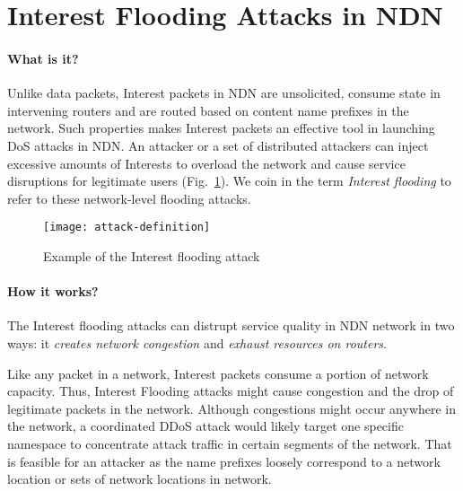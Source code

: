 \section{Interest Flooding Attacks in NDN}
\label{sec:interest flooding}



\paragraph{What is it?}

Unlike data packets, Interest packets in NDN are unsolicited, consume state in intervening routers and are routed based on content name prefixes in the network. Such properties makes Interest packets an effective tool in launching DoS attacks in NDN. An attacker or a set of distributed attackers can inject excessive amounts of Interests to overload the network and cause service disruptions for legitimate users (Fig.~\ref{fig:flooding example}). We coin in the term \emph{Interest flooding} to refer to these network-level flooding attacks.

\begin{figure}[htbp]
  \centering
  \texttt{[image: attack-definition]}
  \caption{Example of the Interest flooding attack}
  \label{fig:flooding example}
\end{figure}

\paragraph{How it works?}

The Interest flooding attacks can distrupt service quality in NDN network in two ways: it \emph{creates network congestion} and \emph{exhaust resources on routers}.

Like any packet in a network, Interest packets consume a portion of network capacity. Thus, Interest Flooding attacks might cause congestion and the drop of legitimate packets in the network. Although congestions might occur anywhere in the network, a coordinated DDoS attack would likely target one specific namespace to concentrate attack traffic in certain segments of the network. That is feasible for an attacker as the name prefixes loosely correspond to a network location or sets of network locations in network. 

